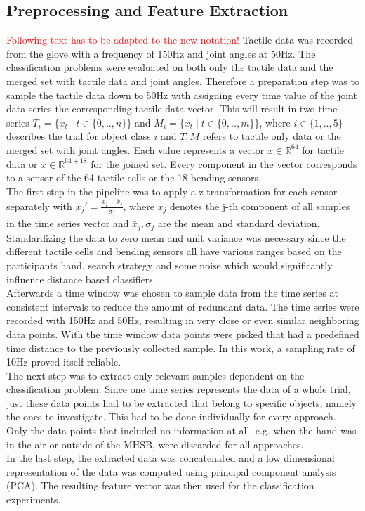 \subsection{Preprocessing and Feature Extraction}
\textcolor{red}{Following text has to be adapted to the new notation!}
Tactile data was recorded from the glove with a frequency of 150Hz and joint angles at 50Hz. The classification problems were evaluated on both only the tactile data and the merged set with tactile data and joint angles. Therefore a preparation step was to sample the tactile data down to 50Hz with assigning every time value of the joint data series the corresponding tactile data vector. This will result in two time series $ T_{i} = \{x_{t} \mid t \in \{0,..,n\}\} $ and $ M_{i} = \{x_{t} \mid t \in \{0,..,m\}\} $, where $ i \in \{1,..,5\}$ describes the trial for object class $i$ and $ T,M $ refers to tactile only data or the merged set with joint angles. Each value represents a vector $x \in \mathbb{R}^{64}$ for tactile data or $ x \in \mathbb{R}^{64+18} $ for the joined set. Every component in the vector corresponds to a sensor of the 64 tactile cells or the 18 bending sensors.\\
The first step in the pipeline was to apply a z-transformation for each sensor separately with $ x_{j}' = \frac{x_{j}-\bar{x}_{j}}{\sigma_{j}} $, where $ x_{j} $ denotes the j-th component of all samples in the time series vector and $ \bar{x}_{j},\sigma_{j} $ are the mean and standard deviation. Standardizing the data to zero mean and unit variance was necessary since the different tactile cells and bending sensors all have various ranges based on the participants hand, search strategy and some noise which would significantly influence distance based classifiers.\\
Afterwards a time window was chosen to sample data from the time series at consistent intervals to reduce the amount of redundant data. The time series were recorded with 150Hz and 50Hz, resulting in very close or even similar neighboring data points. With the time window data points were picked that had a predefined time distance to the previously collected sample. In this work, a sampling rate of 10Hz proved itself reliable.\\
The next step was to extract only relevant samples dependent on the classification problem. Since one time series represents the data of a whole trial, just these data points had to be extracted that belong to specific objects, namely the ones to investigate. This had to be done individually for every approach. Only the data points that included no information at all, e.g. when the hand was in the air or outside of the MHSB, were discarded for all approaches. \\
In the last step, the extracted data was concatenated and a low dimensional representation of the data was computed using principal component analysis (PCA). The resulting feature vector was then used for the classification experiments. 

